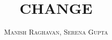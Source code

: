 \documentclass[twoside]{article}
\title{\vspace{-15mm}\fontsize{24pt}{10pt}\selectfont\textbf{CHANGE}} %
\author{
\large
\textsc{Manish Raghavan, Serena Gupta}
\vspace{-5mm}
}
\date{}
\begin{document}
\maketitle %

\thispagestyle{fancy} %


\begin{abstract}

\noindent %

\end{abstract}

\end{document}
